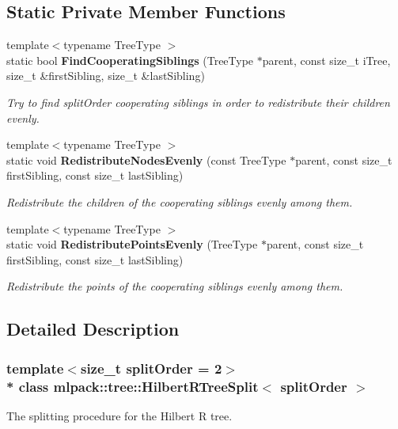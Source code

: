 \subsection*{Static Private Member Functions}
\begin{DoxyCompactItemize}
\item 
{\footnotesize template$<$typename Tree\+Type $>$ }\\static bool {\bf Find\+Cooperating\+Siblings} (Tree\+Type $\ast$parent, const size\+\_\+t i\+Tree, size\+\_\+t \&first\+Sibling, size\+\_\+t \&last\+Sibling)
\begin{DoxyCompactList}\small\item\em Try to find split\+Order cooperating siblings in order to redistribute their children evenly. \end{DoxyCompactList}\item 
{\footnotesize template$<$typename Tree\+Type $>$ }\\static void {\bf Redistribute\+Nodes\+Evenly} (const Tree\+Type $\ast$parent, const size\+\_\+t first\+Sibling, const size\+\_\+t last\+Sibling)
\begin{DoxyCompactList}\small\item\em Redistribute the children of the cooperating siblings evenly among them. \end{DoxyCompactList}\item 
{\footnotesize template$<$typename Tree\+Type $>$ }\\static void {\bf Redistribute\+Points\+Evenly} (Tree\+Type $\ast$parent, const size\+\_\+t first\+Sibling, const size\+\_\+t last\+Sibling)
\begin{DoxyCompactList}\small\item\em Redistribute the points of the cooperating siblings evenly among them. \end{DoxyCompactList}\end{DoxyCompactItemize}


\subsection{Detailed Description}
\subsubsection*{template$<$size\+\_\+t split\+Order = 2$>$\\*
class mlpack\+::tree\+::\+Hilbert\+R\+Tree\+Split$<$ split\+Order $>$}

The splitting procedure for the Hilbert R tree. 


